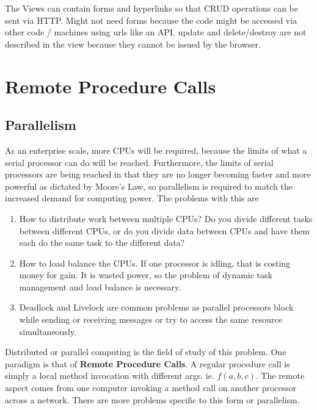 \documentclass[11pt]{article}
\begin{document}
The Views can contain forms and hyperlinks so that CRUD operations can be sent via HTTP. Might not need forms because the code might be accessed via other code / machines using urls like an API. update and delete/destroy are not described in the view because they cannot be issued by the browser.



\section{Remote Procedure Calls}
\label{sec:RPC}

\subsection{Parallelism}
As an enterprise scale, more CPUs will be required, because the limits of what a serial processor can do will be reached. Furthermore, the limits of serial processors are being reached in that they are no longer becoming faster and more powerful as dictated by Moore's Law, so parallelism is required to match the increased demand for computing power. The problems with this are
\begin{enumerate}
   \item How to distribute work between multiple CPUs? Do you divide different tasks between different CPUs, or do you divide data between CPUs and have them each do the same task to the different data?
   \item How to load balance the CPUs. If one processor is idling, that is costing money for gain. It is wasted power, so the problem of dynamic task management and load balance is necessary.
   \item Deadlock and Livelock are common problems as parallel processors block while sending or receiving messages or try to access the same resource simultaneously.
 \end{enumerate}

 Distributed or parallel computing is the field of study of this problem. One paradigm is that of \textbf{Remote Procedure Calls}. A regular procedure call is simply a local method invocation with different args. ie. $f(a, b, c)$. The remote aspect comes from one computer invoking a method call on another processor across a network. There are more problems specific to this form or parallelism.
\end{document}
